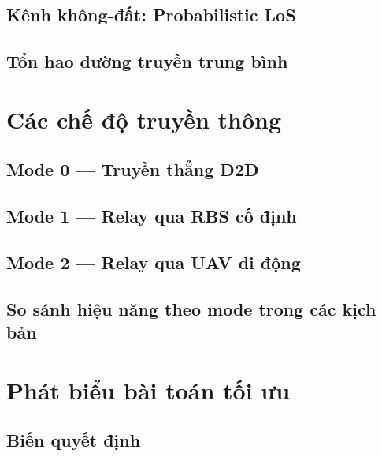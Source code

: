 \subsection{Kênh không-đất: Probabilistic LoS}
\label{subsec:sys:channel:a2g}

\subsection{Tổn hao đường truyền trung bình}
\label{subsec:sys:channel:pathloss}

\section{Các chế độ truyền thông}
\label{sec:sys:modes}

\subsection{Mode 0 --- Truyền thẳng D2D}
\label{subsec:sys:mode0}

\subsection{Mode 1 --- Relay qua RBS cố định}
\label{subsec:sys:mode1}

\subsection{Mode 2 --- Relay qua UAV di động}
\label{subsec:sys:mode2}

\subsection{So sánh hiệu năng theo mode trong các kịch bản}
\label{subsec:sys:mode:compare}

\section{Phát biểu bài toán tối ưu}
\label{sec:sys:optimization}

\subsection{Biến quyết định}
\label{subsec:sys:opt:vars}


